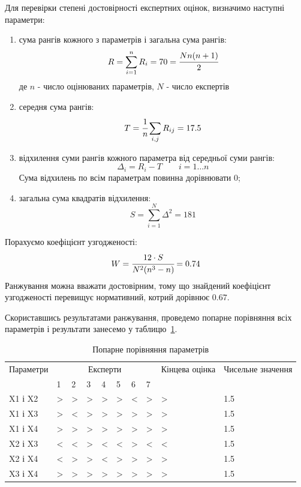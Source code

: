 Для перевірки степені достовірності експертних оцінок, визначимо наступні параметри: 
\begin{enumerate}
	\item сума рангів кожного з параметрів і загальна сума рангів:
	\begin{equation}
		R = \sum\limits_{i=1}^{n} R_i = 70 = \cfrac{Nn(n+1)}{2}
	\end{equation}
	де $n$ - число оцінюваних параметрів, $N$ - число експертів
	
	\item середня сума рангів:
	\begin{equation}
		T = \cfrac 1n \sum\limits_{i,j} R_{ij} = 17.5
	\end{equation}
	
	\item відхилення суми рангів кожного параметра від середньої суми рангів:
	\begin{equation}
		\Delta_i = R_i - T \qquad i=1\ldots n
	\end{equation}
	Сума відхилень по всім параметрам повинна дорівнювати $0$;
	
	\item загальна сума квадратів відхилення:
	\begin{equation}
		S = \sum\limits_{i=1}^{N} \Delta^2 = 181
	\end{equation}
\end{enumerate}

Порахуємо коефіцієнт узгодженості: 
\begin{equation}
	W = \cfrac{12\cdot S}{N^2(n^3-n)} = 0.74
\end{equation}
Ранжування можна вважати достовірним, тому що знайдений коефіцієнт узгодженості перевищує нормативний, котрий дорівнює $0.67$.

Скориставшись результатами ранжування, проведемо попарне порівняння всіх параметрів і результати занесемо у таблицю~\ref{tab:economics:pair_wise_eval}.
\begin{table}
	\caption{Попарне порівняння параметрів}
	\centering
	\begin{tabular}{| p{} | p{} | p{} | p{} | p{} | p{} | p{} | p{} | p{}|p{}|}
	\hline
	Параметри	& \multicolumn{7}{c|}{Експерти} & Кінцева оцінка & Чисельне значення \\
	\cline{2-8}
				& 1 & 2 & 3 & 4 & 5 & 6 & 7		&				& \\
	\hline
	X1 і X2 &>& >& >& >& >& <& >& > & 1.5 \\
	\hline
	X1 і X3 &> &<&> &> &> &> &> &> & 1.5\\
	\hline	
	X1 і X4 &> &> &> &> &> &> &> &> & 1.5\\
	\hline	
	X2 і X3 &< &< &> &< &< &> &< &< & 1.5\\
	\hline	
	X2 і X4 &< &> &> &< &> &> &> &> & 1.5\\
	\hline	
	X3 і X4 &> &> &> &> &> &> &> &> & 1.5 \\
	\hline	
	\end{tabular}
	\label{tab:economics:pair_wise_eval}
\end{table}

